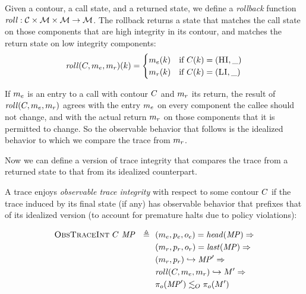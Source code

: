 \documentclass[acmsmall,review,anonymous]{acmart}\settopmatter{printfolios=true,printccs=false,printacmref=false}
\begin{document}
{      

      Given a contour, a call state, and a returned state, we define a
      {\em rollback} function \(\mathit{roll} : {\mathcal C} \times {\mathcal M} \times
      {\mathcal M} \rightarrow {\mathcal M}\). The rollback returns a state that matches
      the call state on those components that are high integrity in its
      contour, and matches the return state on low integrity components:
      \[\mathit{roll}(C,m_e,m_r)(k) =
      \begin{cases}
        m_e(k) & \text{if } C(k) = (\textsc{HI},\_) \\
        m_r(k) & \text{if } C(k) = (\textsc{LI},\_) \\
      \end{cases}\]

      If \(m_e\) is an entry to a call with contour \(C\)
      and \(m_r\) its return, the result of
      \(\mathit{roll}(C,m_e,m_r)\) agrees with the
      entry \(m_e\) on every component the callee should not
      change, and with the actual return \(m_r\) on those
      components that it is permitted to change.  So the observable
      behavior that follows is the idealized behavior to which we
      compare the trace from \(m_r\).

      Now we can define a version of trace integrity that compares the trace
      from a returned state to that from its idealized counterpart.


      A trace enjoys {\em observable trace integrity} with respect to
      some contour \(C\) if the trace induced by its final
      state (if any) has observable behavior that prefixes that of its
      idealized version (to account for premature halts due to policy
      violations):

      \[\begin{split}
        \text{\sc ObsTraceInt} ~ C ~ \mathit{MP} \ \ \triangleq \ \
        & (m_e,p_e,o_e) = \mathit{head}(\mathit{MP}) \Rightarrow \\
        & (m_r,p_r,o_r) = \mathit{last}(\mathit{MP}) \Rightarrow \\
        & (m_r,p_r) \hookrightarrow \mathit{MP}' \Rightarrow \\
        & \mathit{roll}(C,m_e,m_r) \hookrightarrow M'
          \Rightarrow \\
        & \pi_o(\mathit{MP}') \lesssim_O \pi_o(M')
      \end{split}\]

}
\end{document}
